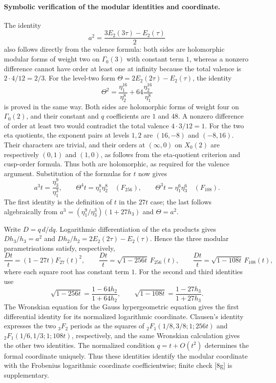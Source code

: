 \documentclass[11pt,a4paper]{article}
\theoremstyle{definition}\newtheorem{definition}[theorem]{Definition}
\theoremstyle{remark}\newtheorem{remark}[theorem]{Remark}
\numberwithin{equation}{section}
\begin{document}
\paragraph{Symbolic verification of the modular identities and coordinate.}
The identity
\[
 a^2=\frac{3E_2(3\tau)-E_2(\tau)}2
\]
also follows directly from the valence formula: both sides are
holomorphic modular forms of weight two on $\Gamma_0(3)$ with constant
term $1$, whereas a nonzero difference cannot have order at least one
at infinity because the total valence is $2\cdot4/12=2/3$.
For the level-two form $\Theta=2E_2(2\tau)-E_2(\tau)$, the identity
\[
 \Theta^2=\frac{\eta_1^{16}}{\eta_2^8}
            +64\frac{\eta_2^{16}}{\eta_1^8}
\]
is proved in the same way. Both sides are holomorphic forms of weight
four on $\Gamma_0(2)$, and their constant and $q$ coefficients are
$1$ and $48$. A nonzero difference of order at least two would contradict
the total valence $4\cdot3/12=1$. For the two eta quotients, the exponent pairs at levels $1,2$ are
$(16,-8)$ and $(-8,16)$. Their characters are trivial, and their orders
at $(\infty,0)$ on $X_0(2)$ are respectively $(0,1)$ and $(1,0)$,
as follows from the eta-quotient criterion and cusp-order formula.
Thus both are holomorphic, as required for the valence argument. Substitution of the formulas for $t$ now gives
\[
 a^3t=\frac{\eta_3^9}{\eta_1^3},\qquad
 \Theta^4t=\eta_1^8\eta_2^8\quad(F_{256}),\qquad
 \Theta^3t=\eta_1^6\eta_3^6\quad(F_{108}).
\]
The first identity is the definition of $t$ in the $27t$ case; the last
follows algebraically from
$a^3=(\eta_1^9/\eta_3^3)(1+27h_3)$ and $\Theta=a^2$.

\smallskip
Write $D=q\,d/dq$. Logarithmic differentiation of the eta products gives
$Dh_3/h_3=a^2$ and $Dh_2/h_2=2E_2(2\tau)-E_2(\tau)$. Hence the three
modular parametrisations satisfy, respectively,
\[
 \frac{Dt}{t}=(1-27t)F_{27}(t)^2,\qquad
 \frac{Dt}{t}=\sqrt{1-256t}\,F_{256}(t),\qquad
 \frac{Dt}{t}=\sqrt{1-108t}\,F_{108}(t),
\]
where each square root has constant term $1$. For the second and third
identities use
\[
 \sqrt{1-256t}=\frac{1-64h_2}{1+64h_2},\qquad
 \sqrt{1-108t}=\frac{1-27h_3}{1+27h_3}.
\]
The Wronskian equation for the Gauss hypergeometric equation gives
the first differential identity for its normalized logarithmic
coordinate. Clausen's identity expresses the two ${}_3F_2$ periods as
the squares of
${}_2F_1(1/8,3/8;1;256t)$ and
${}_2F_1(1/6,1/3;1;108t)$, respectively, and the same Wronskian
calculation gives the other two identities. The normalized condition
$q=t+O(t^2)$ determines the formal coordinate uniquely. Thus these
identities identify the modular coordinate with the Frobenius
logarithmic coordinate coefficientwise; finite check [8g] is
supplementary.
\end{document}
